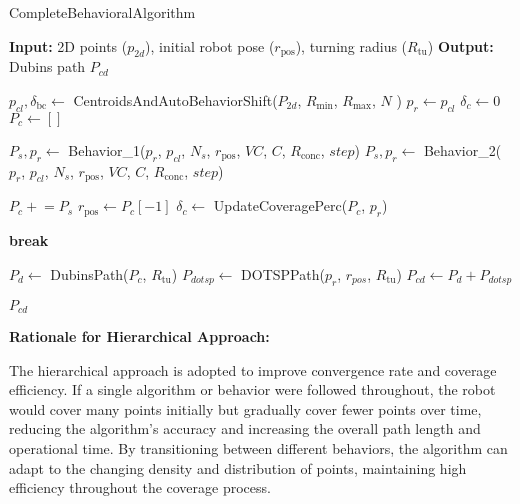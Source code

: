 \begin{algorithm}[H]
    \caption{CompleteBehavioralAlgorithm}
    \label{alg:completebehavioralalgorithm}
    \begin{algorithmic}[1]
    \Statex \textbf{Input:} 2D points ($p_{2d}$), initial robot pose ($r_{\text{pos}}$), turning radius ($R_{\text{tu}}$) 
    \Statex \textbf{Output:} Dubins path $P_{cd}$
    \newline

    \State $p_{cl}, \delta_{\text{bc}} \leftarrow$ CentroidsAndAutoBehaviorShift($P_{2d}$, $R_{\text{min}}$, $R_{\text{max}}$, $N$ )
    \State $p_r \leftarrow p_{cl}$
    \State $\delta_c \leftarrow 0$
    \State $P_c \leftarrow []$
    
            \State $P_s, p_r \leftarrow$ Behavior\_1($p_r$, $p_{cl}$, $N_s$, $r_{\text{pos}}$, $VC$, $C$, $R_{\text{conc}}$, $step$)
        \Else
            \State $P_s, p_r \leftarrow$ Behavior\_2($p_r$, $p_{cl}$, $N_s$, $r_{\text{pos}}$, $VC$, $C$, $R_{\text{conc}}$, $step$)
        \EndIf
        
        \State $P_c \mathrel{+}= P_s$
        \State $r_{\text{pos}} \leftarrow P_c[-1]$
        \State $\delta_c \leftarrow$ UpdateCoveragePerc($P_c$, $p_r$)
        
            \State \textbf{break}
        \EndIf
    \EndWhile
    
    \State $P_d \leftarrow$ DubinsPath($P_c$, $R_{\text{tu}}$)
    \State $P_{dotsp} \leftarrow$ DOTSPPath($p_r$, $r_{pos}$, $R_{\text{tu}}$)
    \State $P_{cd} \leftarrow P_d + P_{dotsp}$

    \State \Return $P_{cd}$
    \end{algorithmic}
\end{algorithm}
    

\textbf{Rationale for Hierarchical Approach: } 

\vspace*{6mm}   


The hierarchical approach is adopted to improve convergence rate and coverage efficiency. If a single algorithm or behavior were followed throughout, the robot would cover many points initially but gradually cover fewer points over time, reducing the algorithm's accuracy and increasing the overall path length and operational time. By transitioning between different behaviors, the algorithm can adapt to the changing density and distribution of points, maintaining high efficiency throughout the coverage process.

